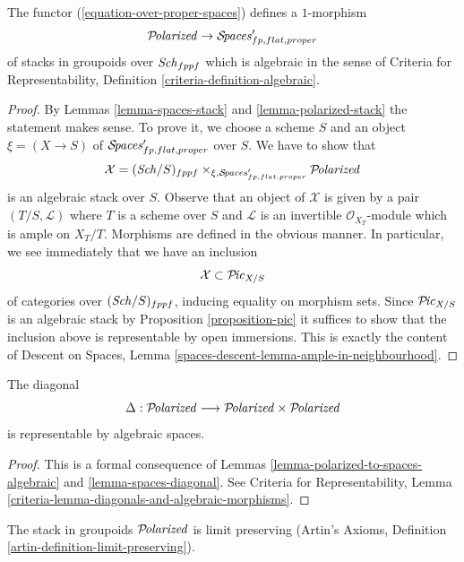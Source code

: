 \begin{lemma}
\label{lemma-polarized-to-spaces-algebraic}
The functor (\ref{equation-over-proper-spaces}) defines a $1$-morphism
$$
\mathcal{P}\!\mathit{olarized} \to \mathcal{S}\!\mathit{paces}'_{fp, flat, proper}
$$
of stacks in groupoids over $\mathit{Sch}_{fppf}$
which is algebraic in the sense of
Criteria for Representability, Definition
\ref{criteria-definition-algebraic}.
\end{lemma}

\begin{proof}
By Lemmas \ref{lemma-spaces-stack} and \ref{lemma-polarized-stack}
the statement makes sense. To prove it, we choose a scheme $S$
and an object $\xi = (X \to S)$ of $\mathcal{S}\!\mathit{paces}'_{fp, flat, proper}$
over $S$. We have to show that
$$
\mathcal{X} = (\mathit{Sch}/S)_{fppf} \times_{\xi, \mathcal{S}\!\mathit{paces}'_{fp, flat, proper}}
\mathcal{P}\!\mathit{olarized}
$$
is an algebraic stack over $S$. Observe that an object of $\mathcal{X}$
is given by a pair $(T/S, \mathcal{L})$ where $T$ is a scheme
over $S$ and $\mathcal{L}$ is an invertible $\mathcal{O}_{X_T}$-module
which is ample on $X_T/T$. Morphisms are defined in the obvious manner.
In particular, we see immediately that we have an inclusion
$$
\mathcal{X} \subset \mathcal{P}\!\mathit{ic}_{X/S}
$$
of categories over $(\mathit{Sch}/S)_{fppf}$, inducing equality on morphism
sets. Since $\mathcal{P}\!\mathit{ic}_{X/S}$ is an algebraic stack by
Proposition \ref{proposition-pic} it suffices to show that the inclusion
above is representable by open immersions. This is exactly the content
of Descent on Spaces, Lemma
\ref{spaces-descent-lemma-ample-in-neighbourhood}.
\end{proof}

\begin{lemma}
\label{lemma-polarized-diagonal}
The diagonal
$$
\Delta : \mathcal{P}\!\mathit{olarized} \longrightarrow
\mathcal{P}\!\mathit{olarized} \times \mathcal{P}\!\mathit{olarized}
$$
is representable by algebraic spaces.
\end{lemma}

\begin{proof}
This is a formal consequence of
Lemmas \ref{lemma-polarized-to-spaces-algebraic} and
\ref{lemma-spaces-diagonal}.
See Criteria for Representability, Lemma
\ref{criteria-lemma-diagonals-and-algebraic-morphisms}.
\end{proof}

\begin{lemma}
\label{lemma-polarized-limits}
The stack in groupoids $\mathcal{P}\!\mathit{olarized}$ is limit preserving
(Artin's Axioms, Definition \ref{artin-definition-limit-preserving}).
\end{lemma}

